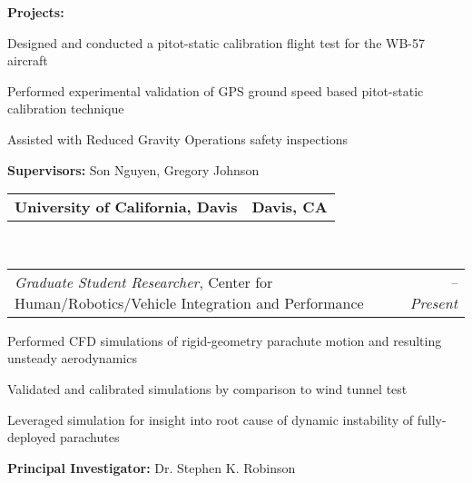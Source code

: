 \documentclass[10pt,letterpaper,MMMyyyy,nonstop]{simpleresumecv}
\makeatletter
\newcommand\hrvip{Center for Human/Robotics/Vehicle Integration and Performance}
\newcommand\UCDavis{University of California, Davis}
\newcommand{\headerrow}[2]
{\begin{tabular*}{\linewidth}{l@{\extracolsep{\fill}}r}
    #1 &
    #2 \\
\end{tabular*}}
\makeatother
\begin{document}
\begin{itemize}
\begin{itemize*}
            \item \textbf{Projects:}
            \begin{itemize*}
                \item Designed and conducted a pitot-static calibration flight test for the WB-57 aircraft
                \item Performed experimental validation of GPS ground speed based pitot-static calibration technique
                \item Assisted with Reduced Gravity Operations safety inspections
            \end{itemize*}

            \item \textbf{Supervisors:} Son Nguyen, Gregory Johnson
        \end{itemize*}

    \item
        \headerrow
        {\textbf{\UCDavis}}
        {\textbf{Davis, CA}}
        \\
        \headerrow
        {\emph{Graduate Student Researcher}, \hrvip}
        {\emph{\DatestampYMD{2013}{09}{020} -- Present}}
        \begin{itemize*}
            \item[]
            \begin{itemize*}
                \item Performed CFD simulations of rigid-geometry parachute motion and resulting unsteady aerodynamics
                \item Validated and calibrated simulations by comparison to wind tunnel test
                \item Leveraged simulation for insight into root cause of dynamic instability of fully-deployed parachutes
            \end{itemize*}
            \item \textbf{Principal Investigator:} Dr. Stephen K. Robinson
        \end{itemize*}


\end{itemize}
\end{document}
